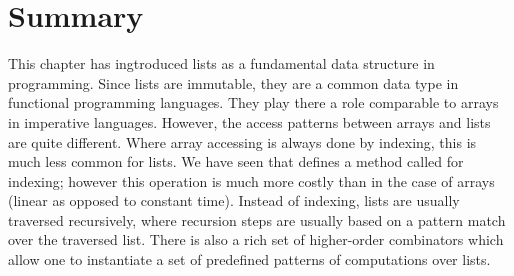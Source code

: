 \section{Summary}

This chapter has ingtroduced lists as a fundamental data structure in
programming. Since lists are immutable, they are a common data type in
functional programming languages. They play there a role comparable to
arrays in imperative languages. However, the access patterns between
arrays and lists are quite different. Where array accessing is always
done by indexing, this is much less common for lists.  We have seen
that  defines a method called  for indexing;
however this operation is much more costly than in the case of arrays
(linear as opposed to constant time). Instead of indexing, lists are
usually traversed recursively, where recursion steps are usually based
on a pattern match over the traversed list. There is also a rich set of
higher-order combinators which allow one to instantiate a set of
predefined patterns of computations over lists.


